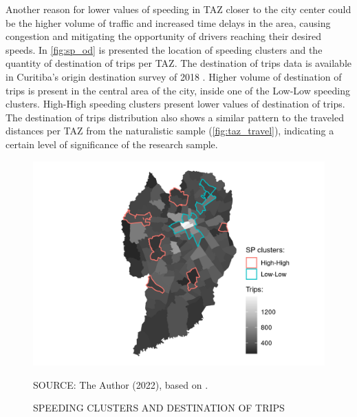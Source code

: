 Another reason for lower values of speeding in TAZ closer to the city center could be the higher volume of traffic and increased time delays in the area, causing congestion and mitigating the opportunity of drivers reaching their desired speeds. In \autoref{fig:sp_od} is presented the location of speeding clusters and the quantity of destination of trips per TAZ. The destination of trips data is available in Curitiba's origin destination survey of 2018 \cite{IPPUC2018b}. Higher volume of destination of trips is present in the central area of the city, inside one of the Low-Low speeding clusters. High-High speeding clusters present lower values of destination of trips. The destination of trips distribution also shows a similar pattern to the traveled distances per TAZ from the naturalistic sample (\autoref{fig:taz_travel}), indicating a 
certain level of significance of the research sample. 

\begin{figure}[!htbp]
    \footnotesize
    \captionsetup{font=footnotesize}
    \caption{SPEEDING CLUSTERS AND DESTINATION OF TRIPS}
    \centering
    \includegraphics{fig/od_plot.png}
    \label{fig:sp_od}
    \par SOURCE: The Author (2022), based on \textcite{IPPUC2018b}.
\end{figure}



